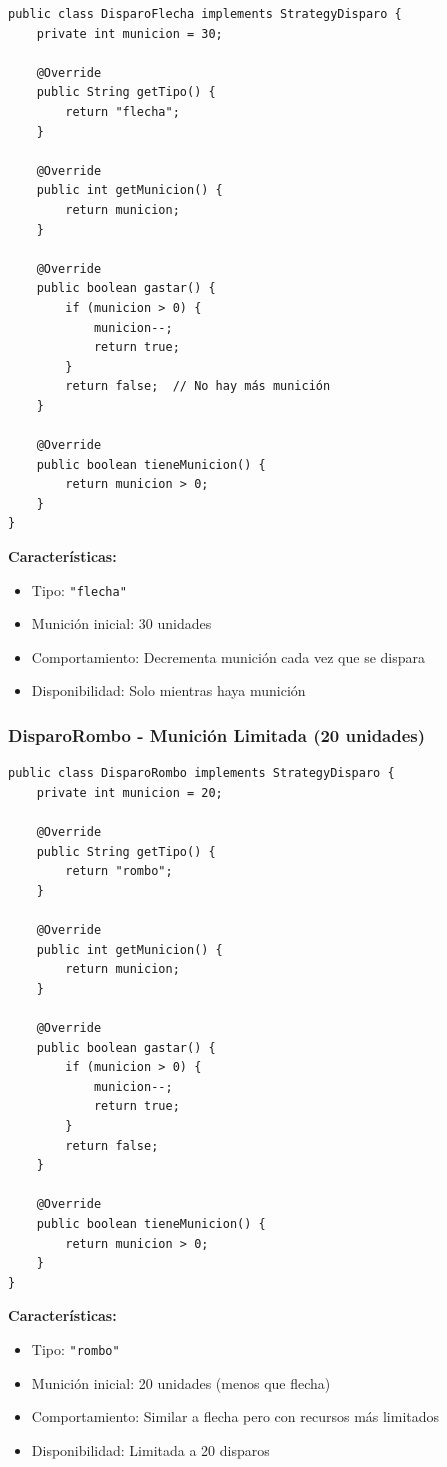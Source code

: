 \documentclass[12pt]{article}
\begin{document}
\begin{lstlisting}
public class DisparoFlecha implements StrategyDisparo {
    private int municion = 30;
    
    @Override
    public String getTipo() {
        return "flecha";
    }
    
    @Override
    public int getMunicion() {
        return municion;
    }
    
    @Override
    public boolean gastar() {
        if (municion > 0) {
            municion--;
            return true;
        }
        return false;  // No hay más munición
    }
    
    @Override
    public boolean tieneMunicion() {
        return municion > 0;
    }
}
\end{lstlisting}

\textbf{Características:}
\begin{itemize}
    \item Tipo: \texttt{"flecha"}
    \item Munición inicial: 30 unidades
    \item Comportamiento: Decrementa munición cada vez que se dispara
    \item Disponibilidad: Solo mientras haya munición
\end{itemize}

\subsubsection{DisparoRombo - Munición Limitada (20 unidades)}

\begin{lstlisting}
public class DisparoRombo implements StrategyDisparo {
    private int municion = 20;
    
    @Override
    public String getTipo() {
        return "rombo";
    }
    
    @Override
    public int getMunicion() {
        return municion;
    }
    
    @Override
    public boolean gastar() {
        if (municion > 0) {
            municion--;
            return true;
        }
        return false;
    }
    
    @Override
    public boolean tieneMunicion() {
        return municion > 0;
    }
}
\end{lstlisting}

\textbf{Características:}
\begin{itemize}
    \item Tipo: \texttt{"rombo"}
    \item Munición inicial: 20 unidades (menos que flecha)
    \item Comportamiento: Similar a flecha pero con recursos más limitados
    \item Disponibilidad: Limitada a 20 disparos
\end{itemize}
\end{document}
